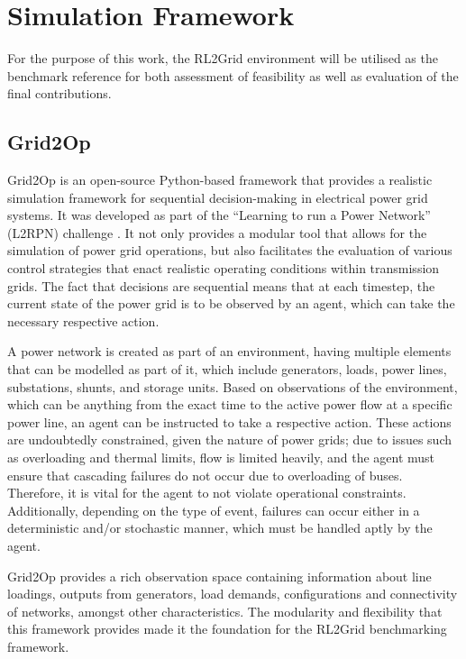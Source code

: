 \section{Simulation Framework}

For the purpose of this work, the RL2Grid environment \cite{marchesini2025rl2grid} will be utilised as the benchmark reference for both assessment of feasibility as well as evaluation of the final contributions. 

\subsection{Grid2Op}

Grid2Op \cite{marot2021learning} is an open-source Python-based framework that provides a realistic simulation framework for sequential decision-making in electrical power grid systems. It was developed as part of the ``Learning to run a Power Network'' (L2RPN) challenge \cite{marot2021learning}. It not only provides a modular tool that allows for the simulation of power grid operations, but also facilitates the evaluation of various control strategies that enact realistic operating conditions within transmission grids. The fact that decisions are sequential means that at each timestep, the current state of the power grid is to be observed by an agent, which can take the necessary respective action. 

A power network is created as part of an environment, having multiple elements that can be modelled as part of it, which include generators, loads, power lines, substations, shunts, and storage units. Based on observations of the environment, which can be anything from the exact time to the active power flow at a specific power line, an agent can be instructed to take a respective action. These actions are undoubtedly constrained, given the nature of power grids; due to issues such as overloading and thermal limits, flow is limited heavily, and the agent must ensure that cascading failures do not occur due to overloading of buses. Therefore, it is vital for the agent to not violate operational constraints. Additionally, depending on the type of event, failures can occur either in a deterministic and/or stochastic manner, which must be handled aptly by the agent.

Grid2Op provides a rich observation space containing information about line loadings, outputs from generators, load demands, configurations and connectivity of networks, amongst other characteristics. The modularity and flexibility that this framework provides made it the foundation for the RL2Grid benchmarking framework.  

